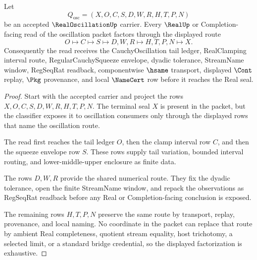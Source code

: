 \begin{theorem}
\label{thm:real-oscillation-clamped-window-factorization}
Let
$$
Q_{\mathrm{osc}}=(X,O,C,S,D,W,R,H,T,P,N)
$$
be an accepted $\RealOscillationUp$ carrier. Every $\RealUp$ or Completion-facing read of the oscillation packet factors through the displayed route
$$
O \longmapsto C \longmapsto S \longmapsto D,W,R \longmapsto H,T,P,N \longmapsto X .
$$
Consequently the read receives the CauchyOscillation tail ledger, RealClamping interval route, RegularCauchySqueeze envelope, dyadic tolerance, StreamName window, RegSeqRat readback, componentwise $\hsame$ transport, displayed $\Cont$ replay, $\Pkg$ provenance, and local $\NameCert$ row before it reaches the Real seal.
\end{theorem}
\begin{proof}
Start with the accepted carrier and project the rows $X,O,C,S,D,W,R,H,T,P,N$. The terminal seal $X$ is present in the packet, but the classifier exposes it to oscillation consumers only through the displayed rows that name the oscillation route.

The read first reaches the tail ledger $O$, then the clamp interval row $C$, and then the squeeze envelope row $S$. These rows supply tail variation, bounded interval routing, and lower-middle-upper enclosure as finite data.

The rows $D,W,R$ provide the shared numerical route. They fix the dyadic tolerance, open the finite StreamName window, and repack the observations as RegSeqRat readback before any Real or Completion-facing conclusion is exposed.

The remaining rows $H,T,P,N$ preserve the same route by transport, replay, provenance, and local naming. No coordinate in the packet can replace that route by ambient Real completeness, quotient stream equality, host trichotomy, a selected limit, or a standard bridge credential, so the displayed factorization is exhaustive.
\end{proof}



